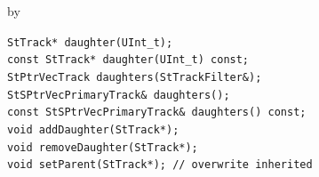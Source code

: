\documentclass[twoside]{article}
\newcommand{\entrylabel}[1]{\mbox{\textbf{{#1}}}\hfil}%
\newenvironment{entry}
{\begin{list}{}%
    {\renewcommand{\makelabel}{\entrylabel}%
     \setlength{\labelwidth}{90pt}%
     \setlength{\leftmargin}{\labelwidth}
     \advance\leftmargin by \labelsep%
      }%
    }%
  {\end{list}}
\newcommand{\Entrylabel}[1]%
{\raisebox{0pt}[1ex][0pt]{\makebox[\labelwidth][l]%
    {\parbox[t]{\labelwidth}{\hspace{0pt}\textbf{{#1}}}}}}
\newenvironment{Entry}%
{\renewcommand{\entrylabel}{\Entrylabel}\begin{entry}}%
  {\end{entry}}
\begin{document}
\begin{Entry}
    \verb+StTrack* daughter(UInt_t);+\\
    \verb+const StTrack* daughter(UInt_t) const;+\\
    
    \verb+StPtrVecTrack daughters(StTrackFilter&);+\\

    \verb+StSPtrVecPrimaryTrack& daughters();+\\
    \verb+const StSPtrVecPrimaryTrack& daughters() const;+\\

    \verb+void addDaughter(StTrack*);+\\

    \verb+void removeDaughter(StTrack*);+\\

    \verb+void setParent(StTrack*); // overwrite inherited+\\
\end{Entry}
\clearpage
\end{document}
